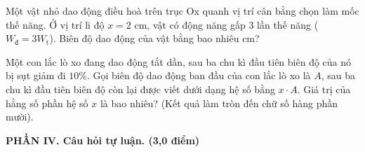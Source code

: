 \begin{ex}	Một vật nhỏ dao động điều hoà trên trục Ox quanh vị trí cân bằng chọn làm mốc thế năng. Ở vị trí li độ $x = 2\text{ cm}$, vật có động năng gấp 3 lần thế năng ($W_{\text{đ}} = 3W_{\text{t}}$). Biên độ dao động của vật bằng bao nhiêu cm?

	\par{}
\end{ex}

\begin{ex}	Một con lắc lò xo đang dao động tắt dần, sau ba chu kì đầu tiên biên độ của nó bị sụt giảm đi $10\%$. Gọi biên độ dao động ban đầu của con lắc lò xo là $A$, sau ba chu kì đầu tiên biên độ còn lại được viết dưới dạng hệ số bằng $x \cdot A$. Giá trị của hằng số phần hệ số $x$ là bao nhiêu? (Kết quả làm tròn đến chữ số hàng phần mười).

	\par{}
\end{ex}


\noindent \textbf{PHẦN IV. Câu hỏi tự luận. (3,0 điểm)}
\vspace{0.2cm}

